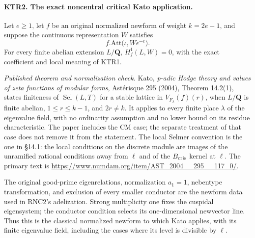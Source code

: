 \paragraph{KTR2. The exact noncentral critical Kato application.}
\label{claim:KTR2}
Let \(e\ge1\), let \(f\) be an original normalized newform
of weight \(k=2e+1\), and suppose the continuous representation
\(W\) satisfies
\[
             f.\mathrm{Att}\bigl(\iota,W\epsilon^{-e}\bigr).
 \tag{KTR.2}
\]
For every finite abelian extension \(L/\mathbf Q\),
\(H^1_f(L,W)=0\), with the exact coefficient and local meaning
of KTR1.

\emph{Published theorem and normalization check.}
Kato, \emph{p-adic Hodge theory and values of zeta functions of
modular forms}, Ast\'erisque 295 (2004), Theorem 14.2(1),
states finiteness of \(\operatorname{Sel}(L,T)\) for a stable
lattice in \(V_{F_\lambda}(f)(r)\), when \(L/\mathbf Q\)
is finite abelian, \(1\le r\le k-1\), and \(2r\ne k\).
It applies to every finite place \(\lambda\) of the eigenvalue
field, with no ordinarity assumption and no lower bound on its
residue characteristic.  The paper includes the CM case; the
separate treatment of that case does not remove it from the
statement.  The local Selmer convention is the one in \S14.1:
the local conditions on the discrete module are images of the
unramified rational conditions away from \(\ell\) and of the
\(B_{\rm cris}\) kernel at \(\ell\).
The primary text is
\url{https://www.numdam.org/item/AST_2004__295__117_0/}.

The original good-prime eigenrelations, normalization
\(a_1=1\), nebentype transformation, and exclusion of every
smaller conductor are the newform data used in RNC2's
adelization.  Strong multiplicity one fixes the cuspidal
eigensystem; the conductor condition selects its one-dimensional
newvector line.  Thus this is the classical normalized newform
to which Kato applies, with its finite eigenvalue field, including
the cases where its level is divisible by \(\ell\).

